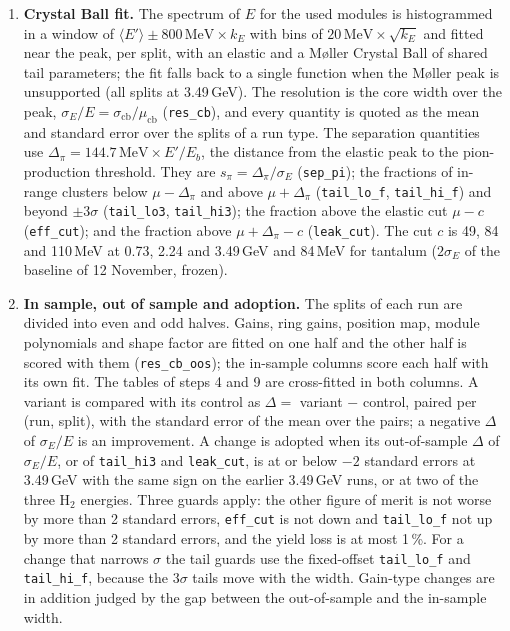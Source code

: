 \documentclass[11pt]{article}
\newcommand{\mev}{\,\mathrm{MeV}}
\newcommand{\code}[1]{\texttt{#1}}
\begin{document}
\begin{enumerate}
\item \textbf{Crystal Ball fit.} The spectrum of $E$ for the used modules is histogrammed in a window of $\langle E' \rangle \pm 800\mev \times k_E$ with bins of $20\mev \times \sqrt{k_E}$ and fitted near the peak, per split, with an elastic and a M{\o}ller Crystal Ball of shared tail parameters; the fit falls back to a single function when the M{\o}ller peak is unsupported (all splits at 3.49\,GeV). The resolution is the core width over the peak, $\sigma_E/E = \sigma_{\mathrm{cb}}/\mu_{\mathrm{cb}}$ (\code{res\_cb}), and every quantity is quoted as the mean and standard error over the splits of a run type. The separation quantities use $\Delta_\pi = 144.7\mev \times E'/E_b$, the distance from the elastic peak to the pion-production threshold. They are $s_\pi = \Delta_\pi / \sigma_E$ (\code{sep\_pi}); the fractions of in-range clusters below $\mu - \Delta_\pi$ and above $\mu + \Delta_\pi$ (\code{tail\_lo\_f}, \code{tail\_hi\_f}) and beyond $\pm 3\sigma$ (\code{tail\_lo3}, \code{tail\_hi3}); the fraction above the elastic cut $\mu - c$ (\code{eff\_cut}); and the fraction above $\mu + \Delta_\pi - c$ (\code{leak\_cut}). The cut $c$ is 49, 84 and 110\,MeV at 0.73, 2.24 and 3.49\,GeV and 84\,MeV for tantalum ($2\sigma_E$ of the baseline of 12 November, frozen).
\item \textbf{In sample, out of sample and adoption.} The splits of each run are divided into even and odd halves. Gains, ring gains, position map, module polynomials and shape factor are fitted on one half and the other half is scored with them (\code{res\_cb\_oos}); the in-sample columns score each half with its own fit. The tables of steps 4 and 9 are cross-fitted in both columns. A variant is compared with its control as $\Delta = $ variant $-$ control, paired per (run, split), with the standard error of the mean over the pairs; a negative $\Delta$ of $\sigma_E/E$ is an improvement. A change is adopted when its out-of-sample $\Delta$ of $\sigma_E/E$, or of \code{tail\_hi3} and \code{leak\_cut}, is at or below $-2$ standard errors at 3.49\,GeV with the same sign on the earlier 3.49\,GeV runs, or at two of the three H$_2$ energies. Three guards apply: the other figure of merit is not worse by more than 2 standard errors, \code{eff\_cut} is not down and \code{tail\_lo\_f} not up by more than 2 standard errors, and the yield loss is at most 1\,\%. For a change that narrows $\sigma$ the tail guards use the fixed-offset \code{tail\_lo\_f} and \code{tail\_hi\_f}, because the $3\sigma$ tails move with the width. Gain-type changes are in addition judged by the gap between the out-of-sample and the in-sample width.
\end{enumerate}
\end{document}
